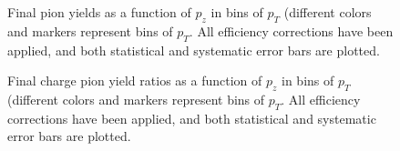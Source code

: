 \documentclass[%
aps, prd, reprint, show pacs, preprint numbers, ams math, amssymb, superscriptaddress, linenumbers]{revtex4-1}
\begin{document}
\begin{figure}[!t] %
   \centering
   \caption{Final pion yields as a function of $p_z$ in bins of $p_T$ (different colors and markers represent bins of $p_T$.  All efficiency corrections have been applied, and both statistical and systematic error bars are plotted.}
   \label{fig:FinalYields}
\end{figure}

\begin{figure}[!htbp] %
   \centering
   \caption{Final charge pion yield ratios as a function of $p_z$ in bins of $p_T$ (different colors and markers represent bins of $p_T$.  All efficiency corrections have been applied, and both statistical and systematic error bars are plotted.}
   \label{fig:FinalRatios}
\end{figure}
\end{document}
